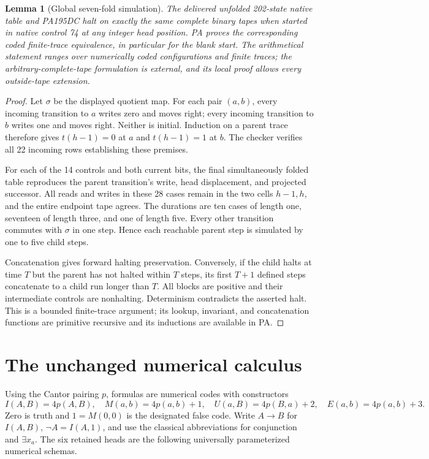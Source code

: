 \documentclass[11pt,letterpaper]{article}
\newtheorem{lemma}[theorem]{Lemma}
\begin{document}
\begin{lemma}[Global seven-fold simulation]\label{lem:fold}
The delivered unfolded 202-state native table and PA195DC halt on exactly
the same complete binary tapes when started in native control 74 at any
integer head position. PA proves the corresponding coded finite-trace
equivalence, in particular for the blank start. The arithmetical
statement ranges over numerically coded configurations and finite traces;
the arbitrary-complete-tape formulation is external, and its local proof
allows every outside-tape extension.
\end{lemma}
\begin{proof}
Let $\sigma$ be the displayed quotient map. For each pair $(a,b)$, every
incoming transition to $a$ writes zero and moves right; every incoming
transition to $b$ writes one and moves right. Neither is initial. Induction
on a parent trace therefore gives $t(h-1)=0$ at $a$ and $t(h-1)=1$ at $b$.
The checker verifies all 22 incoming rows establishing these premises.

For each of the 14 controls and both current bits, the final simultaneously
folded table reproduces the parent transition's write, head displacement,
and projected successor. All reads and writes in these 28 cases remain in
the two cells $h-1,h$, and the entire endpoint tape agrees. The durations
are ten cases of length one, seventeen of length three, and one of length
five. Every other transition commutes with $\sigma$ in one step. Hence
each reachable parent step is simulated by one to five child steps.

Concatenation gives forward halting preservation. Conversely, if the child
halts at time $T$ but the parent has not halted within $T$ steps, its first
$T+1$ defined steps concatenate to a child run longer than $T$. All blocks
are positive and their intermediate controls are nonhalting. Determinism
contradicts the asserted halt. This is a bounded finite-trace argument;
its lookup, invariant, and concatenation functions are primitive recursive
and its inductions are available in PA.
\end{proof}

\section{The unchanged numerical calculus}
\label{sec:calculus}

Using the Cantor pairing $p$, formulas are numerical codes with constructors
\[
 I(A,B)=4p(A,B),\quad M(a,b)=4p(a,b)+1,\quad
 U(a,B)=4p(B,a)+2,\quad E(a,b)=4p(a,b)+3.
\]
Zero is truth and $1=M(0,0)$ is the designated false code. Write
$A\to B$ for $I(A,B)$, $\neg A=I(A,1)$, and use the classical
abbreviations for conjunction and $\exists x_a$. The six retained heads
are the following universally parameterized numerical schemas.
\end{document}
